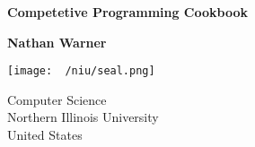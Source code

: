\documentclass{report}
\title{\Huge{}}
\author{\huge{Nathan Warner}}
\date{\huge{}}
\begin{document}
        \begin{titlepage}
       \begin{center}
           \vspace*{1cm}
    
           \textbf{Competetive Programming Cookbook}
    
           \vspace{0.5cm}
            
                
           \vspace{1.5cm}
    
           \textbf{Nathan Warner}
    
           \vfill
                
                
           \vspace{0.8cm}
         
           \texttt{[image: ~/niu/seal.png]}
                
           Computer Science \\
           Northern Illinois University\\
           United States\\
           
                
       \end{center}
    \end{titlepage}
    \tableofcontents
    \pagebreak 
    \bigbreak \noindent 
\end{document}
